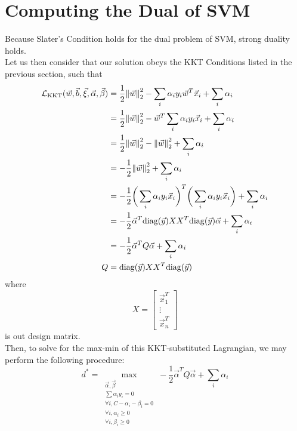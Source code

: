 \section{Computing the Dual of SVM}
Because Slater's Condition holds for the dual problem of SVM, strong duality holds. \\
Let us then consider that our solution obeys the KKT Conditions listed in the previous section, such that
\begin{align*}
    \mathcal{L}_{\rm KKT}(\vec{w}, \vec{b}, \vec{\xi}, \vec{\alpha}, \vec{\beta})
    &= \frac{1}{2} \pnorm[2]{\vec{w}}{2} - \sum_i \alpha_i y_i \vec{w}^T \vec{x}_i + \sum_i \alpha_i \\
    &= \frac{1}{2} \pnorm[2]{\vec{w}}{2} - \vec{w}^T \sum_i \alpha_i y_i \vec{x}_i + \sum_i \alpha_i \\
    &= \frac{1}{2} \pnorm[2]{\vec{w}}{2} - \pnorm[2]{\vec{w}}{2} + \sum_i \alpha_i \\
    &= - \frac{1}{2} \pnorm[2]{\vec{w}}{2} + \sum_i \alpha_i \\
    &= - \frac{1}{2} {\bigg( \sum_i \alpha_i y_i \vec{x}_i \bigg)}^T {\bigg( \sum_i \alpha_i y_i \vec{x}_i \bigg)} + \sum_i \alpha_i \\
    &= - \frac{1}{2} \vec{\alpha}^T {\rm diag}(\vec{y}) X X^T {\rm diag}(\vec{y}) \vec{\alpha} + \sum_i \alpha_i \\
    &= - \frac{1}{2} \vec{\alpha}^T Q \vec{\alpha} + \sum_i \alpha_i \\
    Q &= {\rm diag}(\vec{y}) X X^T {\rm diag}(\vec{y})
\end{align*}
where
\[
    X = \begin{bmatrix} \vec{x}_1^T \\ \vdots \\ \vec{x}_n^T \end{bmatrix}
\]
is out design matrix. \\
Then, to solve for the max-min of this KKT-substituted Lagrangian, we may perform the following procedure:
\[
    d^* = \max_{
        \substack{
            \vec{\alpha}, \vec{\beta} \\
            \sum \alpha_i y_i = 0 \\
            \forall i, C - \alpha_i - \beta_i = 0 \\
            \forall i, \alpha_i \geq 0 \\
            \forall i, \beta_i \geq 0
        }
    } - \frac{1}{2} \vec{\alpha}^T Q \vec{\alpha} + \sum_i \alpha_i
\]


